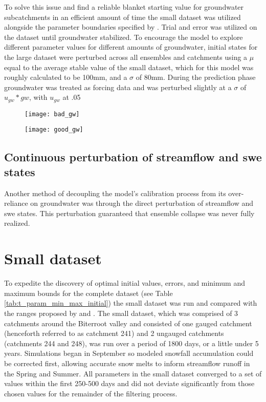 To solve this issue and find a reliable blanket starting value for groundwater subcatchments in an efficient amount of time the small dataset was utilized alongside the parameter boundaries specified by \cite{Maneta2008}. Trial and error was utilized on the dataset until groundwater stabilized. To encourage the model to explore different parameter values for different amounts of groundwater, initial states for the large dataset were perturbed across all ensembles and catchments using a $\mu$ equal to the average stable value of the small dataset, which for this model was roughly calculated to be 100mm, and a $\sigma$ of 80mm. During the prediction phase groundwater was treated as forcing data and was perturbed slightly at a $\sigma$ of $u_{gw} * gw$, with $u_{gw}$  at .05%

\begin{figure}
\centering
\begin{minipage}{.5\textwidth}
  \centering
  \texttt{[image: bad\_gw]}
  \label{fig:bad_gw}
\end{minipage}%
\begin{minipage}{.5\textwidth}
  \centering
  \texttt{[image: good\_gw]}
  \label{fig:good_gw}
\end{minipage}
\end{figure}


\subsection{Continuous perturbation of streamflow and swe states}

Another method of decoupling the model's calibration process from its over-reliance on groundwater was through the direct perturbation of streamflow and swe states. This perturbation guaranteed that ensemble collapse was never fully realized.


\section{Small dataset}

To expedite the discovery of optimal initial values, errors, and minimum and maximum bounds for the complete dataset (see Table \ref{tab:t_param_min_max_initial}) the small dataset was run and compared with the ranges proposed by \cite{Seibert1997} and \cite{Wallner2013}.  The small dataset, which was comprised of 3 catchments around the Biterroot valley and consisted of one gauged catchment (henceforth referred to as catchment 241) and 2 ungauged catchments (catchments 244 and 248), was run over a period of 1800 days, or a little under 5 years. Simulations began in September so modeled snowfall accumulation could be corrected first, allowing accurate snow melts to inform streamflow runoff in the Spring and Summer. All parameters in the small dataset converged to a set of values within the first 250-500 days and did not deviate significantly from those chosen values for the remainder of the filtering process.

